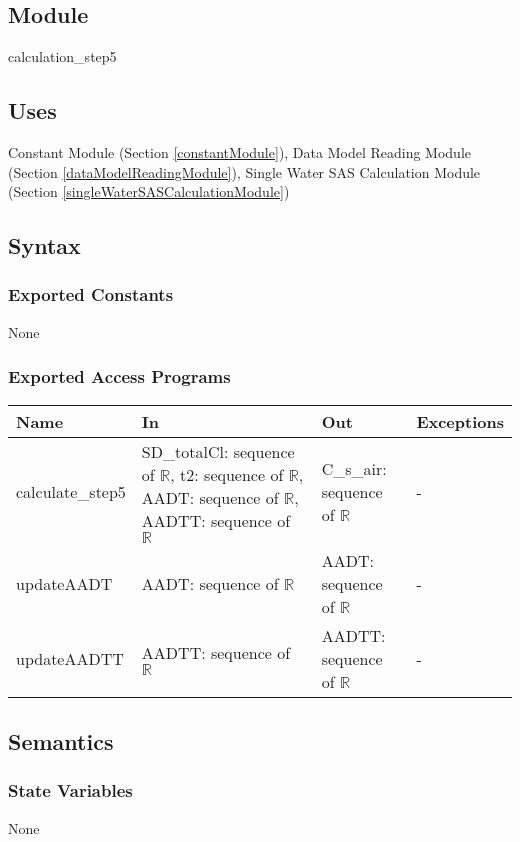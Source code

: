 \documentclass[12pt, titlepage]{article}
\begin{document}
\subsection{Module}
calculation\_step5

\subsection{Uses}
Constant Module (Section \ref{constantModule}), Data Model Reading Module (Section \ref{dataModelReadingModule}), Single Water SAS Calculation Module (Section \ref{singleWaterSASCalculationModule})


\subsection{Syntax}

\subsubsection{Exported Constants}
None
\subsubsection{Exported Access Programs}

\begin{center}
\begin{tabular}{p{2.5cm} p{4.5cm} p{5cm} p{2cm}}
\hline
\textbf{Name} & \textbf{In} & \textbf{Out} & \textbf{Exceptions} \\
\hline
calculate\_step5 & SD\_totalCl: sequence of $\mathbb{R}$, t2: sequence of $\mathbb{R}$, AADT: sequence of $\mathbb{R}$, AADTT: sequence of $\mathbb{R}$ & C\_s\_air: sequence of $\mathbb{R}$ & - \\
updateAADT & AADT: sequence of $\mathbb{R}$ & AADT: sequence of $\mathbb{R}$ & - \\
updateAADTT & AADTT: sequence of $\mathbb{R}$ & AADTT: sequence of $\mathbb{R}$ & - \\
\hline
\end{tabular}
\end{center}

\subsection{Semantics}

\subsubsection{State Variables}
None
\end{document}
